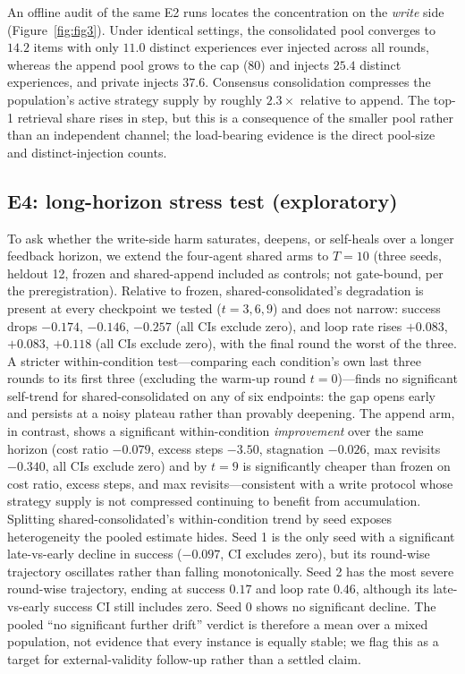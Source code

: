 \documentclass[11pt]{article}
\begin{document}
An offline audit of the same E2 runs locates the concentration on the \emph{write} side
(Figure~\ref{fig:fig3}). Under identical settings, the consolidated pool converges to
$14.2$ items with only $11.0$ distinct experiences ever injected across all rounds, whereas the
append pool grows to the cap ($80$) and injects $25.4$ distinct experiences, and private injects
$37.6$. Consensus consolidation compresses the population's active strategy supply by roughly
$2.3\times$ relative to append. The top-1 retrieval share rises in step, but this is a
consequence of the smaller pool rather than an independent channel; the load-bearing evidence is
the direct pool-size and distinct-injection counts.

\subsection{E4: long-horizon stress test (exploratory)}

To ask whether the write-side harm saturates, deepens, or self-heals over a longer feedback
horizon, we extend the four-agent shared arms to $T{=}10$ (three seeds, heldout 12, frozen and
shared-append included as controls; not gate-bound, per the preregistration). Relative to frozen,
shared-consolidated's degradation is present at every checkpoint we tested ($t=3,6,9$) and does
not narrow: success drops $-0.174$, $-0.146$, $-0.257$ (all CIs exclude zero), and loop rate rises
$+0.083$, $+0.083$, $+0.118$ (all CIs exclude zero), with the final round the worst of the three.
A stricter within-condition test---comparing each condition's own last three rounds to its first
three (excluding the warm-up round $t{=}0$)---finds no significant self-trend for
shared-consolidated on any of six endpoints: the gap opens early and persists at a noisy plateau
rather than provably deepening. The append arm, in contrast, shows a significant within-condition
\emph{improvement} over the same horizon (cost ratio $-0.079$, excess steps $-3.50$, stagnation
$-0.026$, max revisits $-0.340$, all CIs exclude zero) and by $t{=}9$ is significantly cheaper than
frozen on cost ratio, excess steps, and max revisits---consistent with a write protocol whose
strategy supply is not compressed continuing to benefit from accumulation. Splitting
shared-consolidated's within-condition trend by seed exposes heterogeneity the pooled estimate
hides. Seed 1 is the only seed with a significant late-vs-early decline in success
($-0.097$, CI excludes zero), but its round-wise trajectory oscillates rather than falling
monotonically. Seed 2 has the most severe round-wise trajectory, ending at success $0.17$ and
loop rate $0.46$, although its late-vs-early success CI still includes zero. Seed 0 shows no
significant decline. The pooled ``no significant further drift'' verdict is therefore a mean over
a mixed population, not evidence that every instance is equally stable; we flag this as a target
for external-validity follow-up rather than a settled claim.
\end{document}
